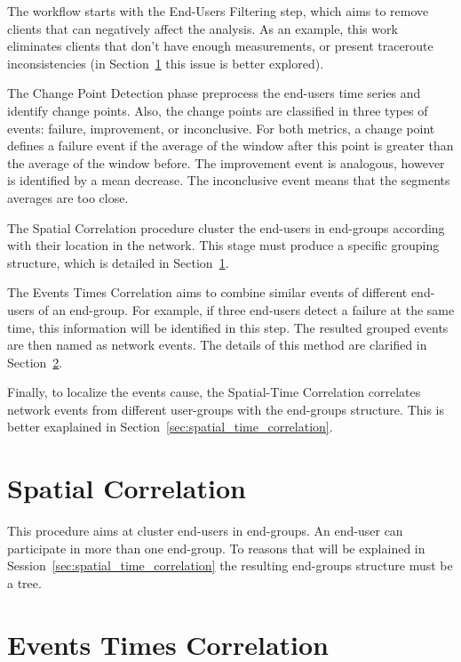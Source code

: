 The workflow starts with the End-Users Filtering step,
which aims to remove clients that can negatively affect the analysis.
As an example, this work eliminates clients
that don't have enough measurements, or present
traceroute inconsistencies (in Section~\ref{sec:spatial_correlation}
this issue is better explored).

The Change Point Detection phase preprocess the end-users time series and
identify change points.
Also, the change points are classified in three types of events: failure,
improvement, or inconclusive. For both metrics, a change point defines a
failure event if the average of the window after this point is greater than the
average of the window before. The improvement event is analogous, however is
identified by a mean decrease.
The inconclusive event means that the segments averages are too close.

The Spatial Correlation procedure cluster the end-users in end-groups
according with their location in the network.
This stage must produce a specific grouping structure, which is detailed in
Section~\ref{sec:spatial_correlation}.

The Events Times Correlation aims to combine similar events of different
end-users of an end-group. For example, if three end-users detect a failure at
the same time, this information will be identified in this step. The resulted
grouped events are then named as network events.
The details of this method are clarified in
Section~\ref{sec:events_times_correlation}.

Finally, to localize the events cause, the Spatial-Time Correlation
correlates network events
from different user-groups with the end-groups structure.
This is better exaplained in Section~\ref{sec:spatial_time_correlation}.

\section{Spatial Correlation}
\label{sec:spatial_correlation}

This procedure aims at cluster end-users in end-groups. An end-user can
participate in more than one end-group. To reasons that will be explained in
Session~\ref{sec:spatial_time_correlation} the resulting end-groups structure
must be a tree.

\section{Events Times Correlation}
\label{sec:events_times_correlation}

